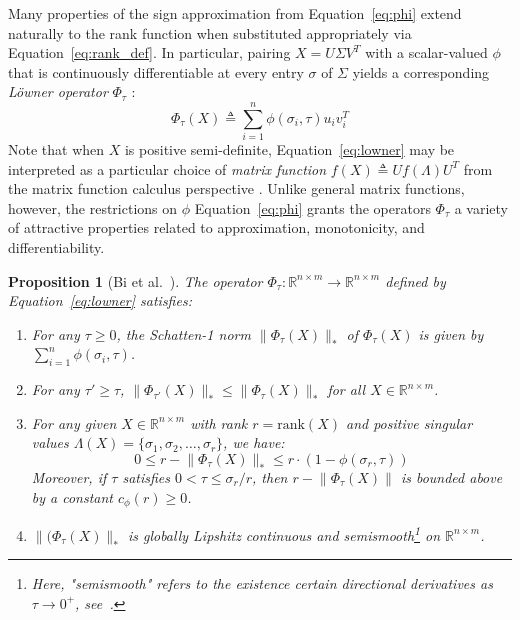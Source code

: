 \documentclass[pdflatex,sn-mathphys-num]{sn-jnl}
\newtheorem{proposition}[theorem]{Proposition}
\begin{document}
Many properties of the sign approximation from Equation~\ref{eq:phi} extend naturally to the rank function when substituted appropriately via Equation~\ref{eq:rank_def}. In particular, pairing \(X = U\Sigma V^{T}\) with a scalar-valued \(\phi\) that is continuously differentiable at every entry \(\sigma\) of \(\Sigma\) yields a corresponding \emph{Löwner operator} \(\Phi_{\tau}\) \cite{bi2013approximation}:
\[\label{eq:lowner}
\Phi_{\tau}(X) \triangleq \sum_{i = 1}^{n}\phi\left( \sigma_{i},\tau \right)u_{i}v_{i}^{T}
\]
Note that when \(X\) is positive semi-definite, Equation~\ref{eq:lowner} may be interpreted as a particular choice of \emph{matrix function} \(f(X) \triangleq Uf(\Lambda)U^{T}\) from the matrix function calculus perspective \cite{bhatia2013matrix}. Unlike general matrix functions, however, the restrictions on \(\phi\) Equation~\ref{eq:phi} grants the operators \(\Phi_{\tau}\) a variety of attractive properties related to approximation, monotonicity, and differentiability.

\begin{proposition}[Bi et al.~\cite{bi2013approximation}]\label{prop:operator_props}
	The operator $\Phi_\tau : \mathbb{R}^{n \times m} \to \mathbb{R}^{n \times m}$ defined by Equation~\ref{eq:lowner} satisfies:
	\begin{enumerate}
		\item For any $\tau \geq 0$, the Schatten-1 norm $\lVert \Phi_\tau (X) \rVert_\ast$ of $\Phi_\tau (X)$ is given by $\sum_{i = 1}^n \phi (\sigma_i, \tau)$.
		\item For any $\tau' \geq \tau$, $\lVert \Phi_{\tau'} (X) \rVert_\ast \leq \lVert \Phi_\tau (X) \rVert_\ast$ for all $X \in \mathbb{R}^{n \times m}$.
		\item For any given $X \in \mathbb{R}^{n \times m}$ with rank $r = \mathrm{rank}(X)$ and positive singular values $\Lambda (X) = \{ \sigma_1 , \sigma_2, \dots , \sigma_r \}$, we have:
		\begin{equation}
			0 \leq r - \lVert \Phi_\tau (X) \rVert_\ast \leq r \cdot (1 - \phi(\sigma_r, \tau))
		\end{equation} 
		Moreover, if $\tau$ satisfies $0 < \tau \leq \sigma_r / r$, then $r - \lVert \Phi_\tau (X) \rVert$ is bounded above by a constant $c_\phi(r) \geq 0$.
		\item $\lVert (\Phi_\tau (X) \rVert_\ast$ is globally Lipshitz continuous and semismooth\footnote{Here, "semismooth" refers to the existence certain directional derivatives as $\tau \to 0^+$, see~\cite{bhatia2013matrix, bi2013approximation}.} on $\mathbb{R}^{n \times m}$.
	\end{enumerate}
\end{proposition}
\end{document}
